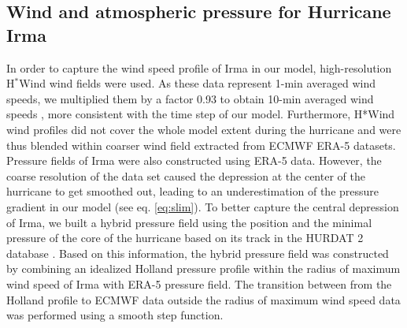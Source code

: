 \documentclass[11pt,a4paper]{article}
\begin{document}
\subsection{Wind and atmospheric pressure for Hurricane Irma}
In order to capture the wind speed profile of Irma in our model, high-resolution H$^\ast$Wind \citep{powell1998hrd} wind fields were used. As these data represent 1-min averaged wind speeds, we multiplied them by a factor 0.93 to obtain 10-min averaged wind speeds \citep{harper2010guidelines}, more consistent with the time step of our model. Furthermore, H*Wind wind profiles did not cover the whole model extent during the hurricane and were thus blended within coarser wind field extracted from ECMWF ERA-5 datasets. Pressure fields of Irma were also constructed using ERA-5 data. However, the coarse resolution of the data set caused the depression at the center of the hurricane to get smoothed out, leading to an underestimation of the pressure gradient in our model (see eq. \ref{eq:slim}). To better capture the central depression of Irma, we built a hybrid pressure field using the position and the minimal pressure of the core of the hurricane based on its track in the HURDAT 2 database \citep{landsea2013atlantic}. Based on this information, the hybrid pressure field was constructed by combining an idealized Holland pressure profile \citep{lin2012hurricane} within the radius of maximum wind speed of Irma \citep{knaff2018statistical} with ERA-5 pressure field. The transition between from the Holland profile to ECMWF data outside the radius of maximum wind speed data was performed using a smooth step function.
\end{document}
